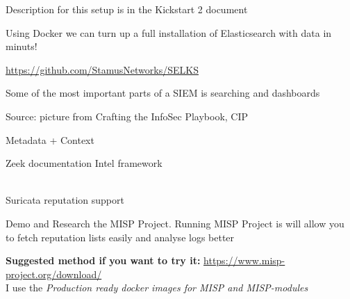 \documentclass[Screen16to9,17pt]{foils}
\begin{document}


\begin{list2}
\item Description for this setup is in the Kickstart 2 document
\item Using Docker we can turn up a full installation of Elasticsearch with data in minuts!
\item \url{https://github.com/StamusNetworks/SELKS}
\end{list2}




\begin{list2}
\item Some of the most important parts of a SIEM is searching and dashboards
\end{list2}






Source: picture from Crafting the InfoSec Playbook, CIP

Metadata + Context



\begin{list1}
\item Zeek documentation Intel framework\\
\\
\item Suricata reputation support\\
\end{list1}




Demo and Research the MISP Project. Running MISP Project is  will allow you to fetch reputation lists easily and analyse logs better

{\bf Suggested method if you want to try it:} \url{https://www.misp-project.org/download/}\\
I use the \emph{Production ready docker images for MISP and MISP-modules }
\end{document}
